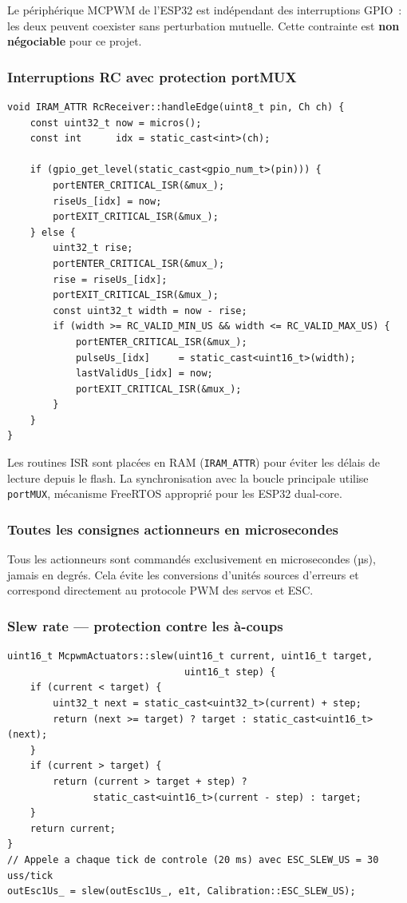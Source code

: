 \documentclass[12pt,a4paper]{article}
\begin{document}
Le périphérique MCPWM de l'ESP32 est indépendant des interruptions GPIO~:
les deux peuvent coexister sans perturbation mutuelle. Cette contrainte est
\textbf{non négociable} pour ce projet.

\subsubsection{Interruptions RC avec protection portMUX}

\begin{lstlisting}[style=cpp, caption={RcReceiver.cpp -- ISR et section critique}]
void IRAM_ATTR RcReceiver::handleEdge(uint8_t pin, Ch ch) {
    const uint32_t now = micros();
    const int      idx = static_cast<int>(ch);

    if (gpio_get_level(static_cast<gpio_num_t>(pin))) {
        portENTER_CRITICAL_ISR(&mux_);
        riseUs_[idx] = now;
        portEXIT_CRITICAL_ISR(&mux_);
    } else {
        uint32_t rise;
        portENTER_CRITICAL_ISR(&mux_);
        rise = riseUs_[idx];
        portEXIT_CRITICAL_ISR(&mux_);
        const uint32_t width = now - rise;
        if (width >= RC_VALID_MIN_US && width <= RC_VALID_MAX_US) {
            portENTER_CRITICAL_ISR(&mux_);
            pulseUs_[idx]     = static_cast<uint16_t>(width);
            lastValidUs_[idx] = now;
            portEXIT_CRITICAL_ISR(&mux_);
        }
    }
}
\end{lstlisting}

Les routines ISR sont placées en RAM (\texttt{IRAM\_ATTR}) pour éviter les
délais de lecture depuis le flash. La synchronisation avec la boucle principale
utilise \texttt{portMUX}, mécanisme FreeRTOS approprié pour les ESP32 dual-core.

\subsubsection{Toutes les consignes actionneurs en microsecondes}

Tous les actionneurs sont commandés exclusivement en microsecondes (µs),
jamais en degrés. Cela évite les conversions d'unités sources d'erreurs et
correspond directement au protocole PWM des servos et ESC.

\subsubsection{Slew rate — protection contre les à-coups}

\begin{lstlisting}[style=cpp, caption={McpwmActuators.cpp -- limitation de variation}]
uint16_t McpwmActuators::slew(uint16_t current, uint16_t target,
                               uint16_t step) {
    if (current < target) {
        uint32_t next = static_cast<uint32_t>(current) + step;
        return (next >= target) ? target : static_cast<uint16_t>(next);
    }
    if (current > target) {
        return (current > target + step) ?
               static_cast<uint16_t>(current - step) : target;
    }
    return current;
}
// Appele a chaque tick de controle (20 ms) avec ESC_SLEW_US = 30 uss/tick
outEsc1Us_ = slew(outEsc1Us_, e1t, Calibration::ESC_SLEW_US);
\end{lstlisting}
\end{document}
